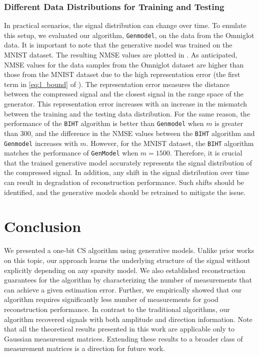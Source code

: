 \documentclass[journal]{IEEEtran}
\begin{document}
\subsubsection{Different Data Distributions for Training and Testing} 
In practical scenarios, the signal distribution can change over time. To emulate this setup, we evaluated our algorithm, \texttt{Genmodel}, on the data from the Omniglot data. It is important to note that the generative model was trained on the MNIST dataset. The resulting NMSE values are plotted in  . As anticipated, NMSE values for the data samples from the Omniglot dataset are higher than those from the MNIST dataset due to the high representation error (the first term in \eqref{eq:l_bound} of ). The representation error measures the distance between the compressed signal and the closest signal in the range space of the generator. This representation error increases with an increase in the mismatch between the training and the testing data distribution. For the same reason, the performance of the \texttt{BIHT} algorithm is better than \texttt{Genmodel} when $m$ is greater than $300$, and the difference in the NMSE values between the \texttt{BIHT} algorithm and  \texttt{Genmodel}  increases with $m$. However, for the MNIST dataset, the \texttt{BIHT} algorithm matches the performance of \texttt{GenModel} when $m = 1500.$ Therefore, it is crucial that the trained generative model accurately represents the signal distribution of the compressed signal. In addition, any shift in the signal distribution over time can result in degradation of reconstruction performance. Such shifts should be identified, and the generative models should be retrained to mitigate the issue.

 

\section{Conclusion}
We presented a one-bit CS algorithm using generative models. Unlike prior works on this topic, our approach learns the underlying structure of the signal without explicitly depending on any sparsity model. We also established reconstruction guarantees for the algorithm by characterizing the number of measurements that can achieve a given estimation error. Further, we empirically showed that our algorithm requires significantly less number of measurements for good reconstruction performance.
In contrast to the traditional algorithms, our algorithm recovered signals with both amplitude and direction information. 
Note that all the theoretical results presented in this work are applicable only to Gaussian measurement matrices. Extending these results to a broader class of measurement matrices is a direction for future work. 
\end{document}
